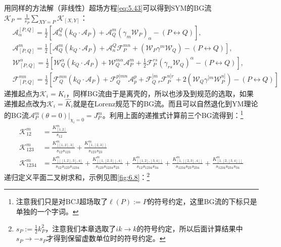 用同样的方法解（非线性）超场方程\ref{eq:5.43}可以得到SYM的BG流$\mathcal{K}_P=\frac{1}{s_P}\sum\limits_{XY=P}\mathcal{K}_{[X,Y]}$：\cite{Lee:2015upy}
\begin{equation}
	\begin{aligned}
		&\mathcal{A}_{\alpha}^{[P,Q]}=\frac{1}{2}\left[\mathcal{A}_\alpha^  {Q}(k_Q\cdot\mathcal{A}_P)+\mathcal{A}_  {Q}^m(\gamma_m\mathcal{W}_P)_\alpha-(P\leftrightarrow  {Q})\right],\\&\mathcal{A}_{[P,  {Q}]}^m=\frac{1}{2}\left[\mathcal{A}_Q^m(k_Q\cdot\mathcal{A}_P)+\mathcal{A}_n^Q\mathcal{F}_P^{mn}+(\mathcal{W}_P\gamma^m\mathcal{W}_  {Q})-(P\leftrightarrow  Q)\right],\\&\mathcal{W}_{[P,  {Q}]}^{\alpha}=\frac{1}{2}\left[\mathcal{W}_Q^\alpha(k_Q\cdot\mathcal{A}_P)+\mathcal{W}_Q^{m\alpha}\mathcal{A}_P^m+\frac{1}{2}\mathcal{F}_P^{rs}(\gamma_{rs}\mathcal{W}_Q)^\alpha-(P\leftrightarrow  Q)\right],\\&\mathcal{F}_{[  {P},  {Q}]}^{mn}=\frac{1}{2}\left[\mathcal{F}_{  {Q}}^{mn}(k_{  {Q}}\cdot\mathcal{A}_{  {P}})+\mathcal{F}_{  {Q}}^{p|mn}\mathcal{A}_{p}^{p}+\mathcal{F}_{  {Q}}^{[m}{}_{r}\mathcal{F}_{P}^{n]r}+2(\mathcal{W}_{  {Q}}\gamma^{[m}\mathcal{W}_{P}^{n]})-(P\leftrightarrow  Q)\right]
	\end{aligned}
\end{equation}
递推起点为$\mathcal{K}_i = K_i$，同样BG流由于是离壳的，所以也涉及到规范的选取，如果递推起点改为$\mathcal{K}_i = \hat{K}_i$就是在Lorenz规范下的BG流。而且可以自然退化到YM理论的BG流$\mathcal{A}_{P}^{m}(\theta=0)|_{\chi_{i}=0}=J_{P}^{m}$。利用上面的递推式计算前三个BG流得到：\footnote{注意我们只是对BCJ超场取了$\ell(P):= P$的符号约定，这里BG流的下标只是单独的一个字词。}
\begin{equation}
	\begin{aligned}
		\mathcal{ K}_{12}^{m}&=\frac{ K_{[1,2]}^m}{s_{12}}\\
		\mathcal{ K}_{123}^{m}&=\frac{ K_{[[1,2],3]}^m}{s_{12}s_{123}}+\frac{ K_{[1,[2,3]]}^m}{s_{123}s_{23}}\\
		\mathcal{ K}_{1234}^m&=\frac{ K_{[[[1,2],3],4]}^m}{s_{12}s_{123}s_{1234}}+\frac{ K_{[[1,[2,3]],4]}^m}{s_{123}s_{1234}s_{23}}+\frac{ K_{[[1,2],[3,4]]}^m}{s_{12}s_{1234}s_{34}}+\frac{ K_{[1,[[2,3],4]]}^m}{s_{1234}s_{23}s_{234}}+\frac{ K_{[1,[2,[3,4]]]}^m}{s_{1234}s_{234}s_{34}}
	\end{aligned}
\end{equation}
递归定义平面二叉树求和\cite{Mafra:2020qst}，示例见图\ref{fig:6.8}：\footnote{$s_P:=\frac12 k_P^2$，注意我们本章选取了$ik\to k$的符号约定，所以后面计算结果中$s_P\to -s_P$才得到保留虚数单位时的符号约定。}
